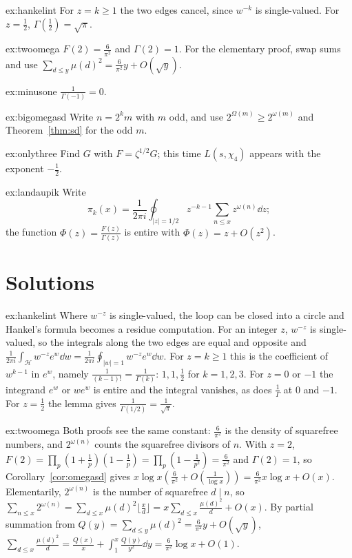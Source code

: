 \begin{hint}{ex:hankelint}
For $z=k\ge1$ the two edges cancel, since $w^{-k}$ is single-valued. For $z=\frac12$, $\Gamma(\frac12)=\sqrt\pi$.
\end{hint}
\begin{hint}{ex:twoomega}
$F(2)=\frac6{\pi^2}$ and $\Gamma(2)=1$. For the elementary proof, swap sums and use $\sum_{d\le y}\mu(d)^2=\frac6{\pi^2}y+O(\sqrt y)$.
\end{hint}
\begin{hint}{ex:minusone}
$\frac1{\Gamma(-1)}=0$.
\end{hint}
\begin{hint}{ex:bigomegasd}
Write $n=2^km$ with $m$ odd, and use $2^{\Omega(m)}\ge2^{\omega(m)}$ and Theorem~\ref{thm:sd} for the odd $m$.
\end{hint}
\begin{hint}{ex:onlythree}
Find $G$ with $F=\zeta^{1/2}G$; this time $L(s,\chi_4)$ appears with the exponent $-\frac12$.
\end{hint}
\begin{hint}{ex:landaupik}
Write
\[
\pi_k(x)=\frac1{2\pi i}\oint_{|z|=1/2}z^{-k-1}\sum_{n\le x}z^{\omega(n)}\dd z;
\]
the function $\Phi(z)=\frac{F(z)}{\Gamma(z)}$ is entire with $\Phi(z)=z+O(z^2)$.
\end{hint}

\section{Solutions}

\begin{solution}{ex:hankelint}
\idea Where $w^{-z}$ is single-valued, the loop can be closed into a circle and Hankel's formula becomes a residue computation.
\writeup For an integer $z$, $w^{-z}$ is single-valued, so the integrals along the two edges are equal and opposite and $\frac1{2\pi i}\int_{\mathcal H}w^{-z}e^w\dd w=\frac1{2\pi i}\oint_{|w|=1}w^{-z}e^w\dd w$. For $z=k\ge1$ this is the coefficient of $w^{k-1}$ in $e^w$, namely $\frac1{(k-1)!}=\frac1{\Gamma(k)}$: $1,1,\frac12$ for $k=1,2,3$. For $z=0$ or $-1$ the integrand $e^w$ or $we^w$ is entire and the integral vanishes, as does $\frac1\Gamma$ at $0$ and $-1$. For $z=\frac12$ the lemma gives $\frac1{\Gamma(1/2)}=\frac1{\sqrt\pi}$.
\end{solution}

\begin{solution}{ex:twoomega}
\idea Both proofs see the same constant: $\frac6{\pi^2}$ is the density of squarefree numbers, and $2^{\omega(n)}$ counts the squarefree divisors of $n$.
\writeup With $z=2$, $F(2)=\prod_p(1+\frac1p)(1-\frac1p)=\prod_p(1-\frac1{p^2})=\frac6{\pi^2}$ and $\Gamma(2)=1$, so Corollary~\ref{cor:omegasd} gives $x\log x(\frac6{\pi^2}+O(\frac1{\log x}))=\frac6{\pi^2}x\log x+O(x)$. Elementarily, $2^{\omega(n)}$ is the number of squarefree $d\mid n$, so $\sum_{n\le x}2^{\omega(n)}=\sum_{d\le x}\mu(d)^2\lfloor\frac xd\rfloor=x\sum_{d\le x}\frac{\mu(d)^2}d+O(x)$. By partial summation from $Q(y)=\sum_{d\le y}\mu(d)^2=\frac6{\pi^2}y+O(\sqrt y)$, $\sum_{d\le x}\frac{\mu(d)^2}d=\frac{Q(x)}x+\int_1^x\frac{Q(y)}{y^2}\dd y=\frac6{\pi^2}\log x+O(1)$.
\end{solution}

